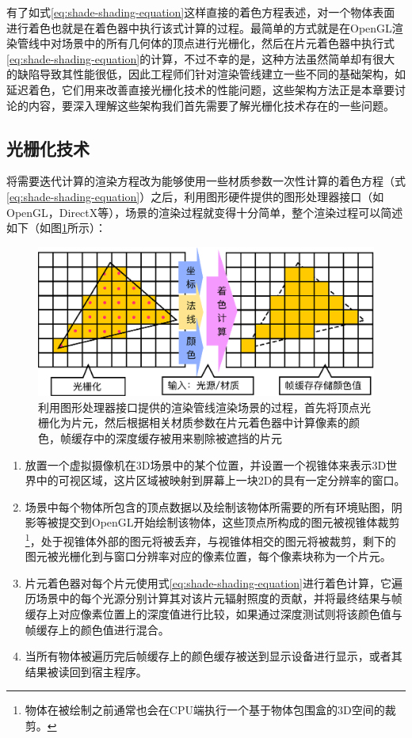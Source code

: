 有了如式\ref{eq:shade-shading-equation}这样直接的着色方程表述，对一个物体表面进行着色也就是在着色器中执行该式计算的过程。最简单的方式就是在OpenGL渲染管线中对场景中的所有几何体的顶点进行光栅化，然后在片元着色器中执行式\ref{eq:shade-shading-equation}的计算，不过不幸的是，这种方法虽然简单却有很大的缺陷导致其性能很低，因此工程师们针对渲染管线建立一些不同的基础架构，如延迟着色，它们用来改善直接光栅化技术的性能问题，这些架构方法正是本章要讨论的内容，要深入理解这些架构我们首先需要了解光栅化技术存在的一些问题。





\subsection{光栅化技术}
将需要迭代计算的渲染方程改为能够使用一些材质参数一次性计算的着色方程（式\ref{eq:shade-shading-equation}）之后，利用图形硬件提供的图形处理器接口（如OpenGL，DirectX等），场景的渲染过程就变得十分简单，整个渲染过程可以简述如下（如图\ref{f:shade-pipeline}所示）：

\begin{figure}
\begin{center}
	\includegraphics[width=.78\textwidth]{figures/shade/pipeline}
\end{center}
	\caption{利用图形处理器接口提供的渲染管线渲染场景的过程，首先将顶点光栅化为片元，然后根据相关材质参数在片元着色器中计算像素的颜色，帧缓存中的深度缓存被用来剔除被遮挡的片元}
	\label{f:shade-pipeline}
\end{figure}

\begin{enumerate}
	\item 放置一个虚拟摄像机在3D场景中的某个位置，并设置一个视锥体来表示3D世界中的可视区域，这片区域被映射到屏幕上一块2D的具有一定分辨率的窗口。
	\item 场景中每个物体所包含的顶点数据以及绘制该物体所需要的所有环境贴图，阴影等被提交到OpenGL开始绘制该物体，这些顶点所构成的图元被视锥体裁剪\footnote{物体在被绘制之前通常也会在CPU端执行一个基于物体包围盒的3D空间的裁剪。}，处于视锥体外部的图元将被丢弃，与视锥体相交的图元将被裁剪，剩下的图元被光栅化到与窗口分辨率对应的像素位置，每个像素块称为一个片元。
	\item 片元着色器对每个片元使用式\ref{eq:shade-shading-equation}进行着色计算，它遍历场景中的每个光源分别计算其对该片元辐射照度的贡献，并将最终结果与帧缓存上对应像素位置上的深度值进行比较，如果通过深度测试则将该颜色值与帧缓存上的颜色值进行混合。
	\item 当所有物体被遍历完后帧缓存上的颜色缓存被送到显示设备进行显示，或者其结果被读回到宿主程序。
\end{enumerate}

